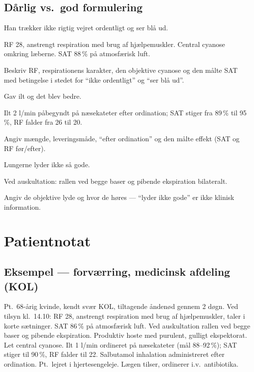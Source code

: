 \documentclass[11pt,a4paper]{report}
\begin{document}
\subsection{Dårlig vs.\ god formulering}
\begin{daarligbox}Han trækker ikke rigtig vejret ordentligt og ser blå ud.\end{daarligbox}
\begin{godbox}RF 28, anstrengt respiration med brug af hjælpemuskler. Central cyanose omkring læberne. SAT 88\,\% på atmosfærisk luft.\end{godbox}
\begin{hvorforbox}Beskriv RF, respirationens karakter, den objektive cyanose og den målte SAT med betingelse i stedet for ``ikke ordentligt'' og ``ser blå ud''.\end{hvorforbox}
\medskip
\begin{daarligbox}Gav ilt og det blev bedre.\end{daarligbox}
\begin{godbox}Ilt 2 l/min påbegyndt på næsekateter efter ordination; SAT stiger fra 89\,\% til 95\,\%, RF falder fra 26 til 20.\end{godbox}
\begin{hvorforbox}Angiv mængde, leveringsmåde, ``efter ordination'' og den målte effekt (SAT og RF før/efter).\end{hvorforbox}
\medskip
\begin{daarligbox}Lungerne lyder ikke så gode.\end{daarligbox}
\begin{godbox}Ved auskultation: rallen ved begge baser og pibende ekspiration bilateralt.\end{godbox}
\begin{hvorforbox}Angiv de objektive lyde og hvor de høres --- ``lyder ikke gode'' er ikke klinisk information.\end{hvorforbox}

\section{Patientnotat}
\subsection{Eksempel --- forværring, medicinsk afdeling (KOL)}
\begin{notebox}
Pt.\ 68-årig kvinde, kendt svær KOL, tiltagende åndenød gennem 2 døgn. Ved tilsyn kl.\ 14.10:
RF 28, anstrengt respiration med brug af hjælpemuskler, taler i korte sætninger. SAT 86\,\% på
atmosfærisk luft. Ved auskultation rallen ved begge baser og pibende ekspiration. Produktiv
hoste med purulent, gulligt ekspektorat. Let central cyanose. Ilt 1 l/min ordineret på
næsekateter (mål 88--92\,\%); SAT stiger til 90\,\%, RF falder til 22. Salbutamol inhalation
administreret efter ordination. Pt.\ lejret i hjertesengeleje. Lægen tilser, ordinerer i.v.\
antibiotika.
\end{notebox}
\end{document}
